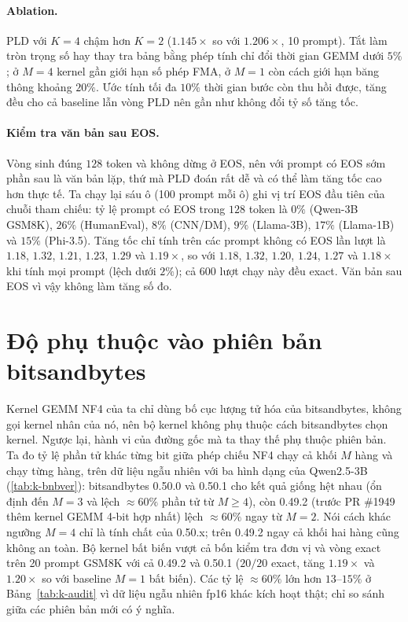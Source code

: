 \paragraph{Ablation.} PLD với $K{=}4$ chậm hơn $K{=}2$ ($1.145\times$ so với $1.206\times$, 10 prompt). Tắt làm tròn trọng số hay thay tra bảng bằng phép tính chỉ đổi thời gian GEMM dưới $5\%$; ở $M{=}4$ kernel gần giới hạn số phép FMA, ở $M{=}1$ còn cách giới hạn băng thông khoảng $20\%$. Ước tính tối đa $10\%$ thời gian bước còn thu hồi được, tăng đều cho cả baseline lẫn vòng PLD nên gần như không đổi tỷ số tăng tốc.

\paragraph{Kiểm tra văn bản sau EOS.} Vòng sinh đúng $128$ token và không dừng ở EOS, nên với prompt có EOS sớm phần sau là văn bản lặp, thứ mà PLD đoán rất dễ và có thể làm tăng tốc cao hơn thực tế. Ta chạy lại sáu ô (100 prompt mỗi ô) ghi vị trí EOS đầu tiên của chuỗi tham chiếu: tỷ lệ prompt có EOS trong $128$ token là $0\%$ (Qwen-3B GSM8K), $26\%$ (HumanEval), $8\%$ (CNN/DM), $9\%$ (Llama-3B), $17\%$ (Llama-1B) và $15\%$ (Phi-3.5). Tăng tốc chỉ tính trên các prompt không có EOS lần lượt là $1.18$, $1.32$, $1.21$, $1.23$, $1.29$ và $1.19\times$, so với $1.18$, $1.32$, $1.20$, $1.24$, $1.27$ và $1.18\times$ khi tính mọi prompt (lệch dưới $2\%$); cả $600$ lượt chạy này đều exact. Văn bản sau EOS vì vậy không làm tăng số đo.

\section{Độ phụ thuộc vào phiên bản bitsandbytes}\label{sec:k-bnbver}
Kernel GEMM NF4 của ta chỉ dùng bố cục lượng tử hóa của bitsandbytes, không gọi kernel nhân của nó, nên bộ kernel không phụ thuộc cách bitsandbytes chọn kernel. Ngược lại, hành vi của đường gốc mà ta thay thế phụ thuộc phiên bản. Ta đo tỷ lệ phần tử khác từng bit giữa phép chiếu NF4 chạy cả khối $M$ hàng và chạy từng hàng, trên dữ liệu ngẫu nhiên với ba hình dạng của Qwen2.5-3B (\cref{tab:k-bnbver}): bitsandbytes 0.50.0 và 0.50.1 cho kết quả giống hệt nhau (ổn định đến $M{=}3$ và lệch $\approx60\%$ phần tử từ $M{\ge}4$), còn 0.49.2 (trước PR \#1949 thêm kernel GEMM 4-bit hợp nhất) lệch $\approx60\%$ ngay từ $M{=}2$. Nói cách khác ngưỡng $M{=}4$ chỉ là tính chất của 0.50.x; trên 0.49.2 ngay cả khối hai hàng cũng không an toàn. Bộ kernel bất biến vượt cả bốn kiểm tra đơn vị và vòng exact trên 20 prompt GSM8K với cả 0.49.2 và 0.50.1 ($20/20$ exact, tăng $1.19\times$ và $1.20\times$ so với baseline $M{=}1$ bất biến). Các tỷ lệ $\approx60\%$ lớn hơn $13$--$15\%$ ở Bảng~\ref{tab:k-audit} vì dữ liệu ngẫu nhiên fp16 khác kích hoạt thật; chỉ so sánh giữa các phiên bản mới có ý nghĩa.

